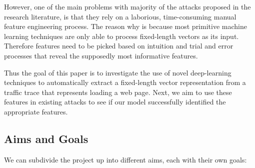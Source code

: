However, one of the main problems with majority of the attacks proposed in the research literature, is that they rely on a laborious,
time-consuming manual feature engineering process. The reason why is because most primitive machine learning techniques are only able to
process fixed-length vectors as its input. Therefore features need to be picked based on intuition and trial and error processes that reveal
the supposedly most informative features.

Thus the goal of this paper is to investigate the use of novel deep-learning techniques to automatically extract
a fixed-length vector representation from a traffic trace that represents loading a web page.
Next, we aim to use these features in existing attacks to see if our model successfully identified the appropriate features.

\newpage

\subsection{Aims and Goals}
We can subdivide the project up into different aims, each with their own goals:

